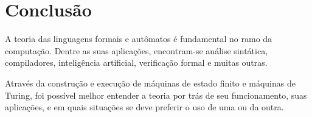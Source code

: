 \section{Conclusão}

A teoria das linguagens formais e autômatos é fundamental no ramo da
computação. Dentre as suas aplicações, encontram-se análise sintática,
compiladores, inteligência artificial, verificação formal e muitas outras.

Através da construção e execução de máquinas de estado finito e máquinas de
Turing, foi possível melhor entender a teoria por trás de seu funcionamento,
suas aplicações, e em quais situações se deve preferir o uso de uma ou da outra.